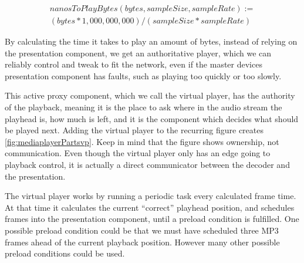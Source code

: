 \begin{equation}\label{eq:ntpb}
	\begin{split}
		nanosToPlayBytes(bytes, sampleSize, sampleRate) :=\\
		(bytes * 1,000,000,000) / (sampleSize * sampleRate)
	\end{split}
\end{equation}

By calculating the time it takes to play an amount of bytes, instead of relying on the
presentation component, we get an authoritative player, which we can
reliably control and tweak to fit the network, even if the master
devices presentation component has faults, such as playing too quickly
or too slowly.

This active proxy component, which we call the virtual player, has the
authority of the playback, meaning it is the place to ask where in the
audio stream the playhead is, how much is left, and it is the component
which decides what should be played next. Adding the virtual player to
the recurring figure creates \cref{fig:mediaplayerPartsvp}. Keep in mind
that the figure shows ownership, not communication. Even though the
virtual player only has an edge going to playback control, it is actually
a direct communicator between the decoder and the presentation.

The virtual player works by running a periodic task every calculated
frame time. At that time it calculates the current ``correct'' playhead
position, and schedules frames into the presentation component, until
a preload condition is fulfilled. One possible preload condition could be
that we must have scheduled three MP3 frames ahead of the current playback
position. However many other possible preload conditions could be used.

